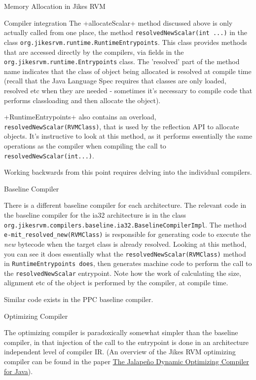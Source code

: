 \begin{section}{Memory Allocation in Jikes RVM}
\begin{subsection}{Compiler integration}
The \spverb+allocateScalar+ method discussed above is only actually called from one place, the method \texttt{re\-sol\-ved\-New\-Sca\-lar(int ...)} in the class \texttt{org.jikes\-rvm.run\-ti\-me.Run\-ti\-me\-En\-try\-points}. This class provides methods that are accessed directly by the compilers, via fields in the \texttt{org.jikes\-rvm.run\-ti\-me.En\-try\-points} class. The 'resolved' part of the method name indicates that the class of object being allocated is resolved at compile time (recall that the Java Language Spec requires that classes are only loaded, resolved etc when they are needed - sometimes it's necessary to compile code that performs classloading and then allocate the object).

\spverb+RuntimeEntrypoints+ also contains an overload, \texttt{re\-sol\-ved\-New\-Sca\-lar(RVM\-Class)}, that is used by the reflection API to allocate objects. It's instructive to look at this method, as it performs essentially the same operations as the compiler when compiling the call to \texttt{re\-sol\-ved\-New\-Sca\-lar(int...)}.

Working backwards from this point requires delving into the individual compilers.

\begin{subsubsection}{Baseline Compiler}

There is a different baseline compiler for each architecture.  The relevant code in the baseline compiler for the ia32 architecture is in the class \texttt{org.jikes\-rvm.com\-pi\-lers.ba\-se\-li\-ne.ia32.Ba\-se\-li\-ne\-Com\-pi\-ler\-Impl}.  The method \texttt{e-mit\_re\-sol\-ved\_new(RVM\-Class)} is responsible for generating code to execute the \textit{new} bytecode when the target class is already resolved.  Looking at this method, you can see it does essentially what the \texttt{re\-sol\-ved\-New\-Sca\-lar(RVMClass)} method in \texttt{RuntimeEntrypoints does}, then generates machine code to perform the call to the \texttt{resolvedNewScalar} entrypoint.  Note how the work of calculating the size, alignment etc of the object is performed by the compiler, at compile time.

Similar code exists in the PPC baseline compiler.

\end{subsubsection}

\begin{subsubsection}{Optimizing Compiler}

The optimizing compiler is paradoxically somewhat simpler than the baseline compiler, in that injection of the call to the entrypoint is done in an architecture independent level of compiler IR.  (An overview of the Jikes RVM optimizing compiler can be found in the paper \href{http://suif.stanford.edu/~jwhaley/papers/javagrande99.pdf}{The Jalape\~no Dynamic Optimizing Compiler for Java}).


\end{subsubsection}
\end{subsection}
\end{section}
